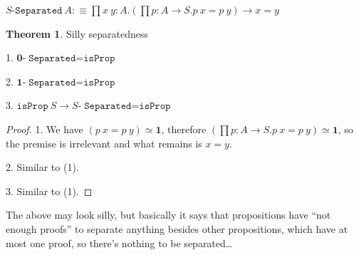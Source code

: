 \documentclass[11pt]{article}
\theoremstyle{definition}
\newtheorem{theorem}{Theorem}[section]
\newcommand{\txt}[1]{\texttt{#1}}
\newcommand{\text}[1]{\texttt{#1}}
\renewcommand{\(}{\left(}
\renewcommand{\)}{\right)}
\newcommand{\defn}{:\equiv}
\newcommand{\isProp}{\text{isProp}}
\newcommand{\apl}[2]{#1\ #2}
\newcommand{\hequiv}[2]{#1 \simeq #2}
\newcommand{\Empty}{\mathbf{0}}
\newcommand{\Unit}{\mathbf{1}}
\newcommand{\dprod}[2]{\prod #1.#2}
\begin{document}
\newcommand{\Separated}[1]{#1$-$\txt{Separated}}
$\displaystyle \apl{\Separated{S}}{A} \defn \dprod{x\ y : A}{\(\dprod{p : A \to S}{\apl{p}{x} = \apl{p}{y}}\) \to x = y}$

\begin{theorem} Silly separatedness

1. $\Separated{\Empty} = \isProp$

2. $\Separated{\Unit} = \isProp$

3. $\apl{\isProp}{S} \to \Separated{S} = \isProp$

\end{theorem}
\begin{proof}
1. We have $\hequiv{(\apl{p}{x} = \apl{p}{y})}{\Unit}$, therefore $\hequiv{(\dprod{p : A \to S}{\apl{p}{x} = \apl{p}{y}})}{\Unit}$, so the premise is irrelevant and what remains is $x = y$.

2. Similar to (1).

3. Similar to (1).
\end{proof}

The above may look silly, but basically it says that propositions have ``not enough proofs'' to separate anything besides other propositions, which have at most one proof, so there's nothing to be separated\dots
\end{document}
